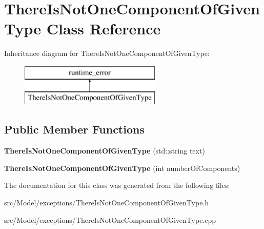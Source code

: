 \hypertarget{classThereIsNotOneComponentOfGivenType}{}\section{There\+Is\+Not\+One\+Component\+Of\+Given\+Type Class Reference}
\label{classThereIsNotOneComponentOfGivenType}
Inheritance diagram for There\+Is\+Not\+One\+Component\+Of\+Given\+Type\+:\begin{figure}[H]
\begin{center}
\leavevmode
\includegraphics[height=2.000000cm]{classThereIsNotOneComponentOfGivenType}
\end{center}
\end{figure}
\subsection*{Public Member Functions}
\begin{DoxyCompactItemize}
\item 
{\bfseries There\+Is\+Not\+One\+Component\+Of\+Given\+Type} (std\+::string text)\hypertarget{classThereIsNotOneComponentOfGivenType_a7bf24ef123a20bcbbf5fe077cdefd8e1}{}\label{classThereIsNotOneComponentOfGivenType_a7bf24ef123a20bcbbf5fe077cdefd8e1}

\item 
{\bfseries There\+Is\+Not\+One\+Component\+Of\+Given\+Type} (int number\+Of\+Components)\hypertarget{classThereIsNotOneComponentOfGivenType_ae0d586ba0a091d66e7b17fce01d17879}{}\label{classThereIsNotOneComponentOfGivenType_ae0d586ba0a091d66e7b17fce01d17879}

\end{DoxyCompactItemize}


The documentation for this class was generated from the following files\+:\begin{DoxyCompactItemize}
\item 
src/\+Model/exceptions/There\+Is\+Not\+One\+Component\+Of\+Given\+Type.\+h\item 
src/\+Model/exceptions/There\+Is\+Not\+One\+Component\+Of\+Given\+Type.\+cpp\end{DoxyCompactItemize}
